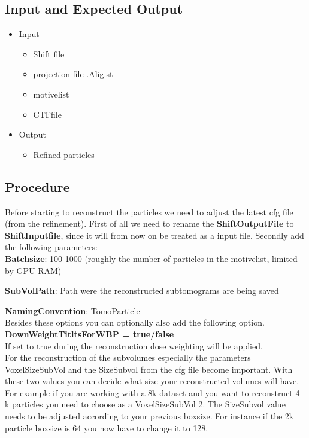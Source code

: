 \documentclass[12pt,a4paper]{scrartcl}
\begin{document}
{\subsection{Input and Expected Output}

\begin{itemize}
	\item Input
	\begin{itemize}
		\item Shift file
		\item projection file .Alig.st
		\item motivelist
		\item CTFfile
	\end{itemize}
	\item Output
	\begin{itemize}
		\item Refined particles
	\end{itemize}	
\end{itemize}
\subsection{Procedure}

Before starting to reconstruct the particles we need to adjust the latest cfg file (from the refinement). First of all we need to rename the \textbf{ShiftOutputFile} to \textbf{ShiftInputfile}, since it will from now on be treated as a input file. Secondly add the following parameters:\\

\textbf{Batchsize}: 100-1000 (roughly the number of particles in the motivelist, limited by GPU RAM)

\textbf{SubVolPath}: Path were the reconstructed subtomograms are being saved 
 
\textbf{NamingConvention}: TomoParticle\\

Besides these options you can optionally also add the following option.\\ 

\textbf{DownWeightTitltsForWBP = true/false}\\

If set to true during the reconstruction dose weighting will be applied.\\

For the reconstruction of the subvolumes especially the parameters VoxelSizeSubVol and the  SizeSubvol from the cfg file become important. With these two values you can decide what size your reconstructed volumes will have. For example if you are working with a 8k dataset and you want to reconstruct 4 k particles you need to choose as a VoxelSizeSubVol 2.  The SizeSubvol value needs to be adjusted according to your previous boxsize. For instance if the 2k particle boxsize is 64 you now have to change it to 128.\\ 

}
\end{document}
